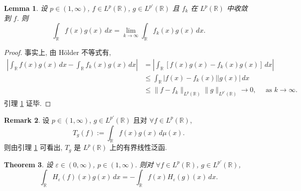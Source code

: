 \documentclass[a4paper,11pt]{article}
\newtheorem{theorem}{Theorem}[section]
\newtheorem{lemma}[theorem]{Lemma}
\theoremstyle{definition}
\newtheorem{remark}[theorem]{Remark}
\begin{document}
\begin{CJK*}{UTF8}{gbsn}
\begin{lemma} \label{lem6}
    设 $ p \in (1, \infty) $, $ f \in L^p(\mathbb{R}) $, $ g \in L^{p'}(\mathbb{R}) $
    且 $ f_k $ 在 $ L^p(\mathbb{R}) $ 中收敛到 $ f $. 则 
    $$
        \int_\mathbb{R} f(x) g(x) \, dx 
            = \lim_{k \to \infty} \int_\mathbb{R} f_k(x) g(x) \, dx.
    $$
\end{lemma}

\begin{proof}
    事实上, 由 H\"older 不等式有,
    \begin{align*}
        \left| \int_\mathbb{R} f(x) g(x) \, dx - \int_\mathbb{R} f_k(x) g(x) \, dx \right|
            &= \left| \int_\mathbb{R} [f(x) g(x) - f_k(x) g(x)] \, dx \right| \\
            &\leq \int_\mathbb{R} |f(x) - f_k(x)| |g(x)|  \, dx \\
            &\leq \| f - f_k \|_{L^p(\mathbb{R})} \| g \|_{L^{p'}(\mathbb{R})}
            \to 0, \quad \text{ as } k \to \infty.
    \end{align*}
    引理 \ref{lem6} 证毕. 
\end{proof}

\begin{remark}
    设 $ p \in (1, \infty) $, $ g \in L^{p'}(\mathbb{R}) $ 且对 $ \forall f \in L^p(\mathbb{R}) $,
    $$
        T_g(f) := \int_\mathbb{R} f(x) g(x) \, d\mu(x).
    $$
    则由引理 \ref{lem6} 可看出, $ T_g $ 是 $ L^p(\mathbb{R}) $ 上的有界线性泛函.
\end{remark}

\begin{theorem} \label{thm3}
    设 $ \varepsilon \in (0, \infty) $, $ p \in (1, \infty) $. 
    则对 $ \forall f \in L^p(\mathbb{R}) $, $ g \in L^{p'}(\mathbb{R}) $,
    $$
        \int_\mathbb{R} H_\varepsilon (f)(x) g(x) \, dx
            = -\int_\mathbb{R} f(x) H_\varepsilon (g)(x) \, dx.
    $$
\end{theorem}


\end{CJK*}
\end{document}

